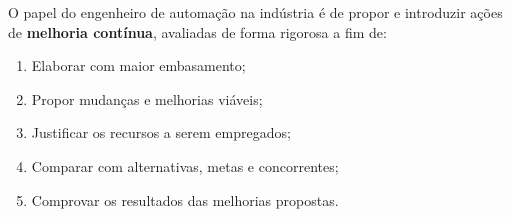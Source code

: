 
O papel do engenheiro de automação na indústria é de propor e introduzir ações de \textbf{melhoria contínua}, avaliadas de forma rigorosa a fim de:
\begin{enumerate}
    \item Elaborar com maior embasamento;
    \item Propor mudanças e melhorias viáveis;
    \item Justificar os recursos a serem empregados;
    \item Comparar com alternativas, metas e concorrentes;
    \item Comprovar os resultados das melhorias propostas.
\end{enumerate}	


